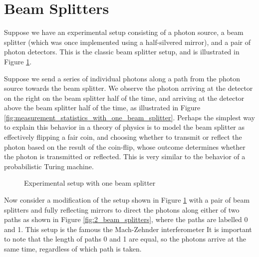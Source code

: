 \documentclass[11pt, oneside]{article}   	%
\begin{document}
\section{Beam Splitters}
Suppose we have an experimental setup consisting of a photon source, a beam splitter (which was once implemented using a half-silvered mirror), and a pair of photon detectors. This is the classic beam splitter setup, and is illustrated in Figure \ref{fig:one_beam_splitter_setup}.

\bigskip
\noindent
Suppose we send a series of individual photons along a path from the photon source towards the beam splitter. We observe the photon arriving at the detector on the right on the beam splitter half of the time, and arriving at the detector above the beam splitter half of the time, as illustrated in Figure \ref{fig:measurement_statistics_with_one_beam_splitter}. Perhaps the simplest way to explain this behavior in a theory of physics is to model the beam splitter as effectively flipping a fair coin, and choosing whether to transmit or reflect the
photon based on the result of the coin-flip, whose outcome determines whether the photon is transmitted or reflected.
This is very similar to the behavior of a probabilistic Turing machine. 


\begin{figure}
\caption{Experimental setup with one beam splitter}
\label{fig:one_beam_splitter_setup}
\end{figure}



\bigskip
\noindent
Now consider a modification of the setup shown in Figure \ref{fig:one_beam_splitter_setup}
with  a pair of beam splitters and fully reflecting mirrors to direct the photons along either of two paths as shown in Figure \ref{fig:2_beam_splitters}, where the paths are labelled 0 and 1. This setup is the
famous  the Mach-Zehnder interferometer \cite{0031-9120-35-1-308}  It is important to note that the length of paths 0 and 1 are equal, so the photons arrive at the same time, regardless of which path is taken.
\end{document}
